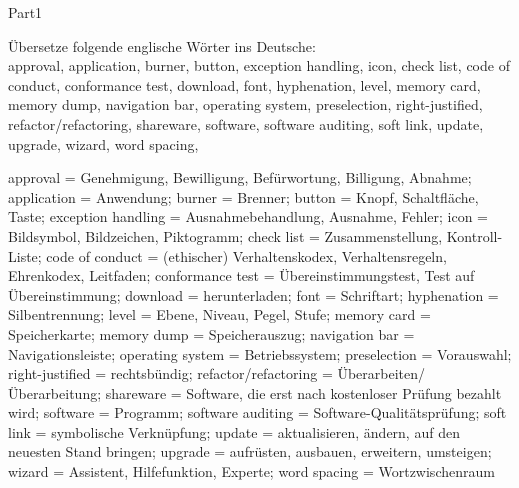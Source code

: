 \documentclass[a4paper,twoside]{article}
\begin{document}
\begin{exam}[Teil I.]{Part1}
\begin{problem}[3]
Übersetze folgende englische Wörter ins Deutsche:\\
approval, %
application, %
burner, %
button, %
exception handling, %
icon, %
check list, %
code of conduct, %
conformance test, %
download, %
font, %
hyphenation, %
level, %
memory card, %
memory dump, %
navigation bar, %
operating system, %
preselection, %
right-justified, %
refactor/refactoring, %
shareware, %
software, %
software auditing, %
soft link, %
update, %
upgrade, %
wizard, %
word spacing, %
\begin{solution}
approval = Genehmigung, Bewilligung, Befürwortung, Billigung, Abnahme;
application =  Anwendung;
burner =  Brenner;
button =  Knopf, Schaltfläche, Taste;
exception handling =  Ausnahmebehandlung, Ausnahme, Fehler;
icon =  Bildsymbol, Bildzeichen, Piktogramm;
check list =  Zusammenstellung, Kontroll-Liste;
code of conduct =  (ethischer) Verhaltenskodex, Verhaltensregeln, Ehrenkodex, Leitfaden;
conformance test =  Übereinstimmungstest, Test auf Übereinstimmung;
download =  herunterladen;
font =  Schriftart;
hyphenation =  Silbentrennung;
level =  Ebene, Niveau, Pegel, Stufe;
memory card =  Speicherkarte;
memory dump =  Speicherauszug;
navigation bar =  Navigationsleiste;
operating system =  Betriebssystem;
preselection =  Vorauswahl;
right-justified =  rechtsbündig;
refactor/refactoring =  Überarbeiten/Überarbeitung;
shareware =  Software, die erst nach kostenloser Prüfung bezahlt wird;
software =  Programm;
software auditing =  Software-Qualitätsprüfung;
soft link =  symbolische Verknüpfung;
update =  aktualisieren, ändern, auf den neuesten Stand bringen;
upgrade =  aufrüsten, ausbauen, erweitern, umsteigen;
wizard =  Assistent, Hilfefunktion, Experte;
word spacing = Wortzwischenraum
\end{solution}
\end{problem}



\end{exam}
\end{document}
